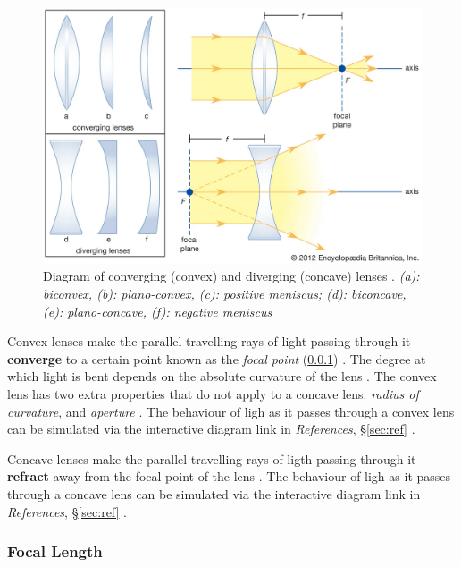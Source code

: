 \documentclass[12pt]{article}
\begin{document}
\begin{figure}[H]
    \centering
    \includegraphics[width=15cm]{lenses.png}
    \caption{\centering Diagram of converging (convex) and diverging (concave) lenses \protect\cite{britlens}.
    \newline
    \centering \scriptsize{\textit{(a): biconvex, (b): plano-convex, (c): positive meniscus; (d): biconcave, (e): plano-concave, (f): negative meniscus}}}
    \label{fig:lens}
\end{figure}

Convex lenses make the parallel travelling rays of light passing through it \textbf{converge} to a certain point known as the \textit{focal point} (\ref{sec:1.1.1})
\cite{studyconvexlens}.
The degree at which light is bent depends on the absolute curvature of the lens
\cite{shanghaiconvex}.
The convex lens has two extra properties that do not apply to a concave lens: \textit{radius of curvature}, and \textit{aperture}
\cite{geekconvex}.
The behaviour of ligh as it passes through a convex lens can be simulated via the interactive diagram link in \textit{References}, §\ref{sec:ref}
\cite{convexinteract}.

Concave lenses make the parallel travelling rays of ligth passing through it \textbf{refract} away from the focal point of the lens
\cite{studyconvexlens,studyconcavelens}.
The behaviour of ligh as it passes through a concave lens can be simulated via the interactive diagram link in \textit{References}, §\ref{sec:ref}
\cite{concaveinteract}.

\subsubsection{Focal Length} \label{sec:1.1.1}
\end{document}
